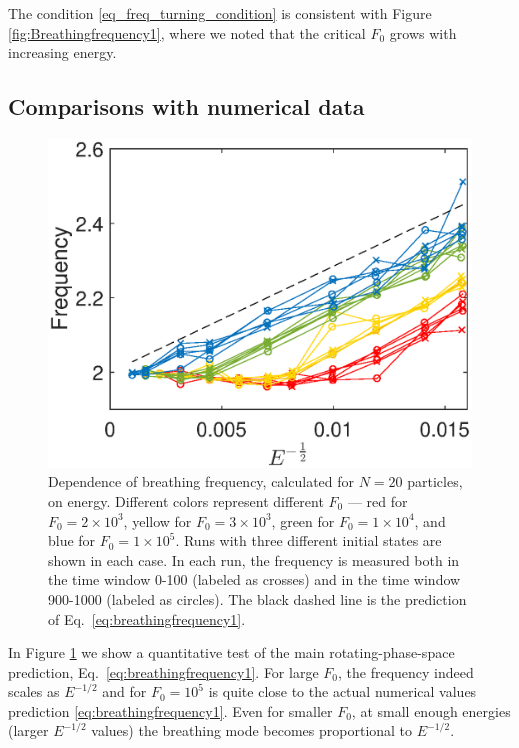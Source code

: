 \documentclass[aps,preprintnumbers,onecolumn,amsmath,amssymb,floatfix,pra]{revtex4-1}
\begin{document}
The condition \eqref{eq_freq_turning_condition} is consistent with Figure
\ref{fig:Breathingfrequency1}, where we noted that the critical $F_0$ grows with increasing energy.


\subsection{Comparisons with numerical data}


\begin{figure}[h]
\centering
\includegraphics[scale=0.6]{ZhiyuPictures/freq_scanF_scanE_pre_Font18.eps}
\caption{Dependence of breathing frequency, calculated for $N=20$ particles, on energy.  Different
  colors represent different $F_0$ --- red for $F_0=2\times10^3$, yellow for $F_0=3\times10^3$,
  green for $F_0=1\times10^4$, and blue for $F_0=1\times10^5$.  Runs with three different initial
  states are shown in each case.  In each run, the frequency is measured both in the time window
  0-100 (labeled as crosses) and in the time window 900-1000 (labeled as circles). The black dashed
  line is the prediction of Eq.~\eqref{eq:breathingfrequency1}.}
\label{fig:Breathingfrequency4}
\end{figure}


In Figure \ref{fig:Breathingfrequency4} we show a quantitative test of the main rotating-phase-space
prediction, Eq.~\eqref{eq:breathingfrequency1}.  For large $F_0$, the frequency indeed scales as
$E^{-1/2}$ and for $F_0=10^5$ is quite close to the actual numerical values prediction
\eqref{eq:breathingfrequency1}.  Even for smaller $F_0$, at small enough energies (larger $E^{-1/2}$
values) the breathing mode becomes proportional to  $E^{-1/2}$. 
\end{document}
